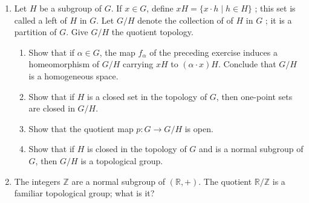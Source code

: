 \begin{enumerate}[itemsep=0.4em, parsep=0pt, topsep=0pt, partopsep=0pt, leftmargin=*, label=\arabic*., ref=\arabic*]
\item Let \(H\) be a subgroup of \(G\). If \(x \in G\), define \({xH} = \{ x \cdot h \mid h \in H\}\) ; this set is called a left  of \(H\) in \(G\). Let \(G/H\) denote the collection of  of \(H\) in \(G\) ; it is a partition of \(G\). Give \(G/H\) the quotient topology.
  \begin{enumerate}[itemsep=0.2em, parsep=0pt, topsep=0pt, partopsep=0pt, leftmargin=*, label=(\alph*), align=left]
  \item Show that if \(\alpha \in G\), the map \(f_{\alpha }\) of the preceding exercise induces a homeomorphism of \(G/H\) carrying \({xH}\) to \(( {\alpha \cdot x}) H\). Conclude that \(G/H\) is a homogeneous space.
  \item Show that if \(H\) is a closed set in the topology of \(G\), then one-point sets are closed in \(G/H\).
  \item Show that the quotient map \(p : G \rightarrow G/H\) is open.
  \item Show that if \(H\) is closed in the topology of \(G\) and is a normal subgroup of \(G\), then \(G/H\) is a topological group.
  \end{enumerate}

\item The integers \(\mathbb{Z}\) are a normal subgroup of \(( {\mathbb{R}, + })\). The quotient \(\mathbb{R}/\mathbb{Z}\) is a familiar topological group; what is it?


\end{enumerate}
